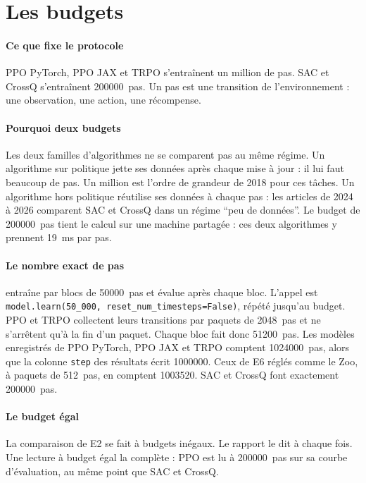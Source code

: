\section{Les budgets}\label{sec:budgets}

\paragraph{Ce que fixe le protocole}
PPO PyTorch, PPO JAX et TRPO s'entraînent un million de pas. SAC et CrossQ s'entraînent \num{200000}~pas. Un
pas est une transition de l'environnement : une observation, une action, une récompense.

\paragraph{Pourquoi deux budgets}
Les deux familles d'algorithmes ne se comparent pas au même régime. Un algorithme sur politique jette ses
données après chaque mise à jour : il lui faut beaucoup de pas. Un million est l'ordre de grandeur de 2018
pour ces tâches. Un algorithme hors politique réutilise ses données à chaque pas : les articles de 2024 à 2026 comparent SAC et
CrossQ dans un régime \enquote{peu de données}. Le budget de \num{200000}~pas tient le calcul sur une
machine partagée : ces deux algorithmes y prennent 19~ms par pas.

\paragraph{Le nombre exact de pas}
 entraîne par blocs de \num{50000}~pas et évalue après chaque bloc. L'appel est
\texttt{model.learn(50\_000, reset\_num\_timesteps=False)}, répété jusqu'au budget. PPO et TRPO collectent leurs transitions par
paquets de \num{2048}~pas et ne s'arrêtent qu'à la fin d'un paquet. Chaque bloc fait donc \num{51200}~pas.
Les modèles enregistrés de PPO PyTorch, PPO JAX et TRPO comptent \num{1024000}~pas, alors que la colonne
\texttt{step} des résultats écrit \num{1000000}. Ceux de E6 réglés comme le Zoo, à paquets de 512~pas, en
comptent \num{1003520}. SAC et CrossQ font exactement \num{200000}~pas.

\paragraph{Le budget égal}
La comparaison de E2 se fait à budgets inégaux. Le rapport le dit à chaque fois. Une lecture à budget égal la
complète : PPO est lu à \num{200000}~pas sur sa courbe d'évaluation, au même point que SAC et CrossQ.

